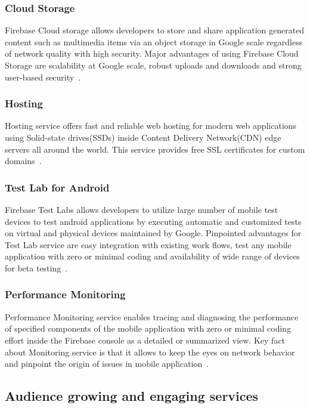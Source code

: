 \subsubsection{Cloud Storage}
Firebase Cloud storage allows developers to store and share application 
generated content such as multimedia items via an object storage in Google 
scale regardless of network quality with high security. Major advantages of 
using Firebase Cloud Storage are scalability at Google scale, robust uploads 
and downloads and strong user-based 
security~\cite{hid-sp18-409-www-firebase-products}.

\subsubsection{Hosting}
Hosting service offers fast and reliable web hosting for modern web 
applications using Solid-state drives(SSDs) inside Content Delivery 
Network(CDN) edge servers all around the world. This service provides free SSL 
certificates for custom domains~\cite{hid-sp18-409-www-firebase, 
	hid-sp18-409-www-firebase-products}.

\subsubsection{Test Lab for Android }
Firebase Test Labs allows developers to utilize large number of mobile test 
devices to test android applications by executing automatic and customized 
tests on virtual and physical devices maintained by Google. Pinpointed 
advantages for Test Lab service are easy integration with existing work flows, 
test any mobile application with zero or minimal coding and availability of 
wide range of devices for beta 
testing~\cite{hid-sp18-409-www-firebase-products}.

\subsubsection{Performance Monitoring}
Performance Monitoring service enables tracing and diagnosing the performance 
of specified components of the mobile application with zero or minimal coding 
effort inside the Firebase console as a detailed or summarized view. Key fact 
about Monitoring service is that it allows to keep the eyes on network behavior 
and pinpoint the origin of issues in mobile 
application~\cite{hid-sp18-409-www-firebase-products}.


\subsection{Audience growing and engaging services}


